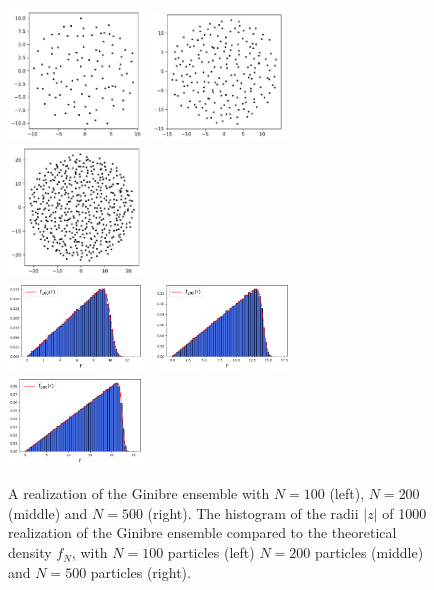 \documentclass[twoside,11pt]{book}
\numberwithin{theorem}{chapter}
\numberwithin{definition}{chapter}
\numberwithin{proposition}{chapter}
\numberwithin{corollary}{chapter}
\numberwithin{example}{chapter}
\numberwithin{lemma}{chapter}
\numberwithin{assumption}{chapter}
\numberwithin{equation}{chapter}
\numberwithin{figure}{chapter}
\begin{document}
\begin{figure}
\centering
\includegraphics[width= 0.32\textwidth]{img/Ginibre/Ginibre_100_example_id_1.pdf}~\includegraphics[width= 0.32\textwidth]{img/Ginibre/Ginibre_200_example_id_2.pdf}~
\includegraphics[width= 0.32\textwidth]{img/Ginibre/Ginibre_500_example_id_3.pdf}\\
\includegraphics[width= 0.32\textwidth]{img/Ginibre/Ginibre_histogram_1000_N_100_example_2.pdf}~
\includegraphics[width= 0.32\textwidth]{img/Ginibre/Ginibre_histogram_1000_N_200_example_2.pdf}~\includegraphics[width= 0.32\textwidth]{img/Ginibre/Ginibre_histogram_1000_N_500_example_2.pdf}
\caption{A realization of the Ginibre ensemble with $N = 100$ (left), $N = 200$ (middle) and $N = 500$ (right). The histogram of the radii $|z|$ of 1000 realization of the Ginibre ensemble compared to the theoretical density $f_{N}$, with $N = 100$ particles (left) $N = 200$ particles (middle) and $N = 500$ particles (right). \label{fig:ginibre}}
\end{figure}
\end{document}
